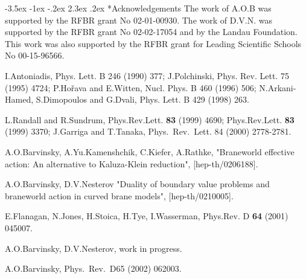 \documentclass[a4paper,12pt]{article}
\makeatletter
\renewcommand\section{\@startsection {section}{1}{\z@}%
                                   {-3.5ex \@plus -1ex \@minus -.2ex}%
                                   {2.3ex \@plus.2ex}%
                                   {\normalfont\large\bfseries}}
\makeatother
\begin{document}
\section*{Acknowledgements}
\hspace{\parindent}The work of A.O.B was supported by the RFBR
grant No 02-01-00930. The work of D.V.N. was supported by the RFBR
grant No 02-02-17054 and by the Landau Foundation. This work was
also supported by the RFBR grant for Leading Scientific Schools
No 00-15-96566.

\begin{thebibliography}{99}
I.Antoniadis,
 Phys. Lett. B {246} (1990) 377;
J.Polchinski,
 Phys. Rev. Lett.  {75} (1995) 4724;
P.Ho\v{r}ava and E.Witten,
 Nucl. Phys. B {460} (1996) 506;
N.Arkani-Hamed, S.Dimopoulos and G.Dvali,
 Phys.$\!$ Lett.$\!$ B$\!$ {429}$\!$ (1998)$\!$ 263.

 L.Randall and R.Sundrum, Phys.Rev.Lett. {\bf 83} (1999)
 4690;
 Phys.Rev.Lett. {\bf 83} (1999) 3370;  J.Garriga and T.Tanaka,
 Phys.\ Rev.\ Lett. 84 (2000) 2778-2781.


 A.O.Barvinsky, A.Yu.Kamenshchik, C.Kiefer, A.Rathke,
"Braneworld effective action: An alternative to Kaluza-Klein
reduction", [hep-th/0206188].

 A.O.Barvinsky, D.V.Nesterov "Duality of boundary
value problems and braneworld action
in curved brane models", [hep-th/0210005].

\fi

 E.Flanagan, N.Jones, H.Stoica, H.Tye, I.Wasserman,
 Phys.Rev. D {\bf 64} (2001) 045007.

 A.O.Barvinsky, D.V.Nesterov, work in progress.

A.O.Barvinsky,
 Phys.\ Rev.\ D{65} (2002) 062003.

\fi



\end{thebibliography}
\end{document}
